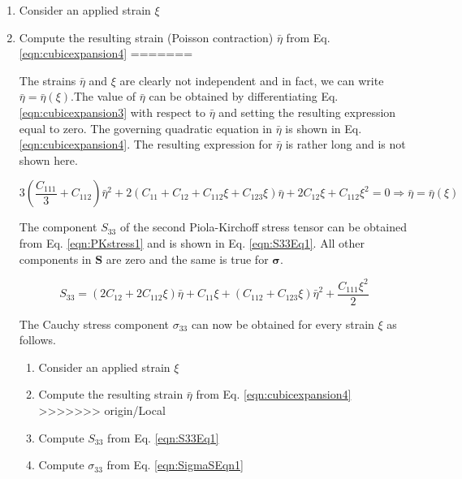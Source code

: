 \documentclass[showpacs,aps,floatfix,prb,reprint,superscriptaddress,onecolumn]{revtex4-1}
\begin{document}
\begin{enumerate}
\itemsep-1.5em 
\item Consider an applied strain $\xi$
\item Compute the resulting strain (Poisson contraction) $\bar{\eta}$ from Eq. \ref{eqn:cubicexpansion4}
=======

The strains $\bar{\eta}$ and $\xi$ are clearly not independent and in fact, we can write $\bar{\eta} = \bar{\eta} \left(\xi\right)$.The value of $\bar{\eta}$ can be obtained by differentiating Eq. \ref{eqn:cubicexpansion3} with respect to $\bar{\eta}$ and setting the resulting expression equal to zero. The governing quadratic equation in $\bar{\eta}$ is shown in Eq. \ref{eqn:cubicexpansion4}. The resulting expression for $\bar{\eta}$ is rather long and is not shown here. 

\begin{equation}
\label{eqn:cubicexpansion4} 
3 \left(\frac{C_{111}}{3} + C_{112}\right) \bar{\eta}^{2} + 2 \left(C_{11} + C_{12} + C_{112} \xi + C_{123} \xi \right) \bar{\eta} + 2 C_{12} \xi + C_{112} \xi^{2} = 0 \Rightarrow \bar{\eta} = \bar{\eta} \left(\xi\right)
\end{equation}

The component $S_{33}$ of the second Piola-Kirchoff stress tensor can be obtained from Eq. \ref{eqn:PKstress1} and is shown in Eq. \ref{eqn:S33Eq1}. All other components in $\mathbf{S}$ are zero and the same is true for $\mathbf{\sigma}$.

\begin{equation}
\label{eqn:S33Eq1} 
S_{33} = \left(2 C_{12} + 2 C_{112} \xi \right) \bar{\eta} + C_{11} \xi + \left(C_{112} + C_{123} \xi \right) \bar{\eta}^{2} + \frac{C_{111} \xi^{2}}{2}
\end{equation}

The Cauchy stress component $\sigma_{33}$ can now be obtained for every strain $\xi$ as follows.

\begin{enumerate}
\itemsep-1.5em 
\item Consider an applied strain $\xi$
\item Compute the resulting strain $\bar{\eta}$ from Eq. \ref{eqn:cubicexpansion4}
>>>>>>> origin/Local
\item Compute $S_{33}$ from Eq. \ref{eqn:S33Eq1}
\item Compute $\sigma_{33}$ from Eq. \ref{eqn:SigmaSEqn1}
\end{enumerate}




\end{enumerate}
\end{document}
